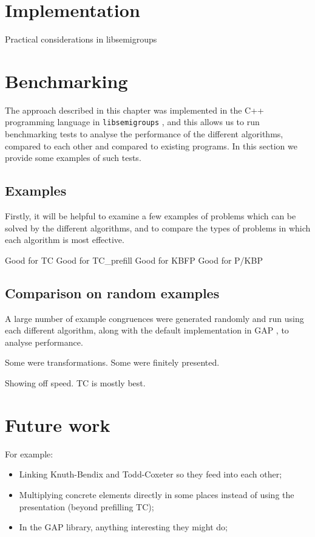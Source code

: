 \section{Implementation}

Practical considerations in libsemigroups

\clearpage

\section{Benchmarking}
\label{sec:benchmarking}

The approach described in this chapter was implemented in the C++ programming
language in \texttt{libsemigroups} \cite{libsemigroups}, and this allows us to
run benchmarking tests to analyse the performance of the different algorithms,
compared to each other and compared to existing programs.  In this section we
provide some examples of such tests.

\subsection{Examples}
Firstly, it will be helpful to examine a few examples of problems which can be
solved by the different algorithms, and to compare the types of problems in
which each algorithm is most effective.

Good for TC
Good for TC_prefill
Good for KBFP
Good for P/KBP

\subsection{Comparison on random examples}
A large number of example congruences were generated randomly and run using each
different algorithm, along with the default implementation in GAP \cite{gap}, to
analyse performance.

Some were transformations.
Some were finitely presented.

Showing off speed.
TC is mostly best.

\clearpage

\section{Future work}

For example:
\begin{itemize}
\item Linking Knuth-Bendix and Todd-Coxeter so they feed into each other;
\item Multiplying concrete elements directly in some places instead of using
  the presentation (beyond prefilling TC);
\item In the GAP library, anything interesting they might do;
\end{itemize}
